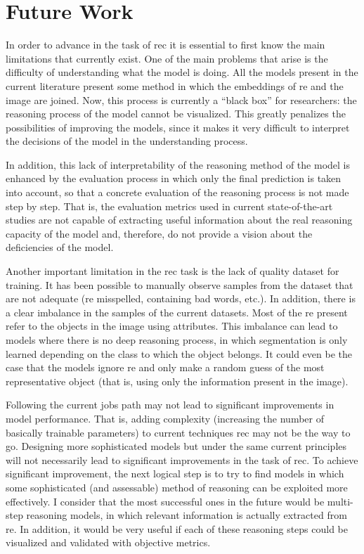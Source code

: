 \section{Future Work}

In order to advance in the task of \gls{rec} it is essential to first know the
main limitations that currently exist. One of the main problems that arise is
the difficulty of understanding what the model is doing. All the models present
in the current literature present some method in which the embeddings of
\gls{re} and the image are joined. Now, this process is currently a ``black
box'' for researchers: the reasoning process of the model cannot be
visualized. This greatly penalizes the possibilities of improving the models,
since it makes it very difficult to interpret the decisions of the model in the
understanding process.

In addition, this lack of interpretability of the reasoning method of the model
is enhanced by the evaluation process in which only the final prediction is
taken into account, so that a concrete evaluation of the reasoning process is
not made step by step. That is, the evaluation metrics used in current
state-of-the-art studies are not capable of extracting useful information about
the real reasoning capacity of the model and, therefore, do not provide a
vision about the deficiencies of the model.

Another important limitation in the \gls{rec} task is the lack of quality
dataset for training. It has been possible to manually observe samples from the
dataset that are not adequate (\gls{re} misspelled, containing bad words,
etc.). In addition, there is a clear imbalance in the samples of the current
datasets. Most of the \gls{re} present refer to the objects in the image using
attributes. This imbalance can lead to models where there is no deep reasoning
process, in which segmentation is only learned depending on the class to which
the object belongs. It could even be the case that the models ignore \gls{re}
and only make a random guess of the most representative object (that is, using
only the information present in the image).

Following the current jobs path may not lead to significant improvements in
model performance. That is, adding complexity (increasing the number of
basically trainable parameters) to current techniques \gls{rec} may not be the
way to go. Designing more sophisticated models but under the same current
principles will not necessarily lead to significant improvements in the task of
\gls{rec}. To achieve significant improvement, the next logical step is to try
to find models in which some sophisticated (and assessable) method of reasoning
can be exploited more effectively. I consider that the most successful ones in
the future would be multi-step reasoning models, in which relevant information
is actually extracted from \gls{re}. In addition, it would be very useful if
each of these reasoning steps could be visualized and validated with objective
metrics.

